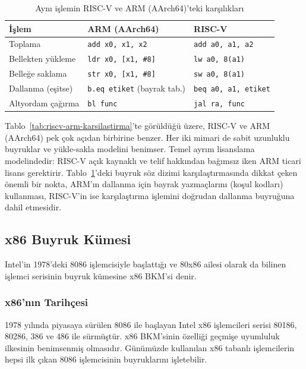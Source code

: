 \begin{table}[H]
\centering
\caption{Aynı işlemin RISC-V ve ARM (AArch64)'teki karşılıkları}
\label{tab:riscv-arm-buyruk}
\small
\begin{tabular}{lll}
\toprule
\textbf{İşlem} & \textbf{ARM (AArch64)} & \textbf{RISC-V} \\
\midrule
Toplama              & \texttt{add x0, x1, x2}           & \texttt{add a0, a1, a2} \\
Bellekten yükleme    & \texttt{ldr x0, [x1, \#8]}        & \texttt{lw a0, 8(a1)} \\
Belleğe saklama      & \texttt{str x0, [x1, \#8]}        & \texttt{sw a0, 8(a1)} \\
Dallanma (eşitse)    & \texttt{b.eq etiket} (bayrak tab.)& \texttt{beq a0, a1, etiket} \\
Altyordam çağırma    & \texttt{bl func}                  & \texttt{jal ra, func} \\
\bottomrule
\end{tabular}
\end{table}

Tablo~\ref{tab:riscv-arm-karsilastirma}'te görüldüğü üzere, RISC-V ve ARM (AArch64) pek çok açıdan birbirine benzer. Her iki mimari de sabit uzunluklu buyruklar ve yükle-sakla modelini benimser. Temel ayrım lisanslama modelindedir: RISC-V açık kaynaklı ve telif hakkından bağımsız iken ARM ticari lisans gerektirir. Tablo~\ref{tab:riscv-arm-buyruk}'deki buyruk söz dizimi karşılaştırmasında dikkat çeken önemli bir nokta, ARM'ın dallanma için bayrak yazmaçlarını (koşul kodları) kullanması, RISC-V'in ise karşılaştırma işlemini doğrudan dallanma buyruğuna dahil etmesidir.


\subsection{x86 Buyruk Kümesi}
\label{sec:x86}

Intel'in 1978'deki 8086 işlemcisiyle başlattığı ve 80x86 ailesi olarak da bilinen işlemci serisinin buyruk kümesine x86 BKM'si denir.

\subsubsection{x86'nın Tarihçesi}

1978 yılında piyasaya sürülen 8086 ile başlayan Intel x86 işlemcileri serisi 80186, 80286, 386 ve 486 ile sürmüştür. x86 BKM'sinin özelliği geçmişe uyumluluk ilkesinin benimsenmiş olmasıdır. Günümüzde kullanılan x86 tabanlı işlemcilerin hepsi ilk çıkan 8086 işlemcisinin buyruklarını işletebilir.

